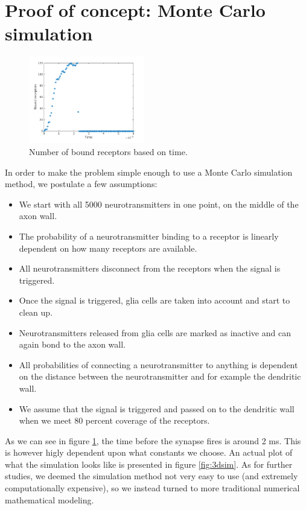 \section{Proof of concept: Monte Carlo simulation}

\begin{figure}[ht]
        \centering
        \includegraphics[width=0.45\textwidth]{boundReceptors}
        \caption{Number of bound receptors based on time.}
        \label{fig:boundReceptors}
\end{figure}

In order to make the problem simple enough to use a Monte Carlo simulation method, we postulate a few assumptions:
\begin{itemize}
\item We start with all 5000 neurotransmitters in one point, on the middle of the axon wall.
\item The probability of a neurotransmitter binding to a receptor is linearly dependent on how many receptors are available.
\item All neurotransmitters disconnect from the receptors when the signal is triggered.
\item Once the signal is triggered, glia cells are taken into account and start to clean up.
\item Neurotransmitters released from glia cells are marked as inactive and can again bond to the axon wall.
\item All probabilities of connecting a neurotransmitter to anything is dependent on the distance between the neurotransmitter and for example the dendritic wall.
\item We assume that the signal is triggered and passed on to the dendritic wall when we meet 80 percent coverage of the receptors.
\end{itemize}


As we can see in figure \ref{fig:boundReceptors}, the time before the synapse fires is around 2 ms. This is however higly dependent upon what constants we choose. An actual plot of what the simulation looks like is presented in figure \ref{fig:3dsim}. As for further studies, we deemed the simulation method not very easy to use (and extremely computationally expensive), so we instead turned to more traditional numerical mathematical modeling.


